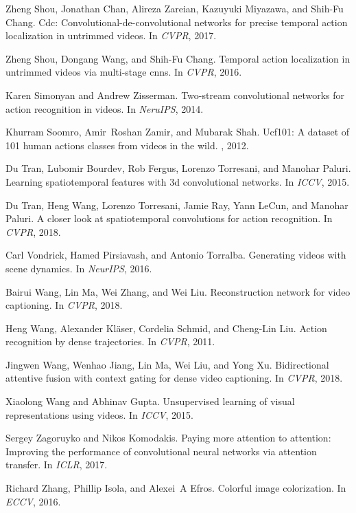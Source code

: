 \documentclass[10pt,twocolumn,letterpaper]{article}
\begin{document}
{\begin{thebibliography}{10}
Zheng Shou, Jonathan Chan, Alireza Zareian, Kazuyuki Miyazawa, and Shih-Fu
  Chang.
\newblock Cdc: Convolutional-de-convolutional networks for precise temporal
  action localization in untrimmed videos.
\newblock In {\em CVPR}, 2017.

Zheng Shou, Dongang Wang, and Shih-Fu Chang.
\newblock Temporal action localization in untrimmed videos via multi-stage
  cnns.
\newblock In {\em CVPR}, 2016.

Karen Simonyan and Andrew Zisserman.
\newblock Two-stream convolutional networks for action recognition in videos.
\newblock In {\em NeruIPS}, 2014.

Khurram Soomro, Amir~Roshan Zamir, and Mubarak Shah.
\newblock Ucf101: A dataset of 101 human actions classes from videos in the
  wild.
, 2012.

Du Tran, Lubomir Bourdev, Rob Fergus, Lorenzo Torresani, and Manohar Paluri.
\newblock Learning spatiotemporal features with 3d convolutional networks.
\newblock In {\em ICCV}, 2015.

Du Tran, Heng Wang, Lorenzo Torresani, Jamie Ray, Yann LeCun, and Manohar
  Paluri.
\newblock A closer look at spatiotemporal convolutions for action recognition.
\newblock In {\em CVPR}, 2018.

Carl Vondrick, Hamed Pirsiavash, and Antonio Torralba.
\newblock Generating videos with scene dynamics.
\newblock In {\em NeurIPS}, 2016.

Bairui Wang, Lin Ma, Wei Zhang, and Wei Liu.
\newblock Reconstruction network for video captioning.
\newblock In {\em CVPR}, 2018.

Heng Wang, Alexander Kl{\"a}ser, Cordelia Schmid, and Cheng-Lin Liu.
\newblock Action recognition by dense trajectories.
\newblock In {\em CVPR}, 2011.

Jingwen Wang, Wenhao Jiang, Lin Ma, Wei Liu, and Yong Xu.
\newblock Bidirectional attentive fusion with context gating for dense video
  captioning.
\newblock In {\em CVPR}, 2018.

Xiaolong Wang and Abhinav Gupta.
\newblock Unsupervised learning of visual representations using videos.
\newblock In {\em ICCV}, 2015.

Sergey Zagoruyko and Nikos Komodakis.
\newblock Paying more attention to attention: Improving the performance of
  convolutional neural networks via attention transfer.
\newblock In {\em ICLR}, 2017.

Richard Zhang, Phillip Isola, and Alexei~A Efros.
\newblock Colorful image colorization.
\newblock In {\em ECCV}, 2016.

\end{thebibliography}
 }
\end{document}
